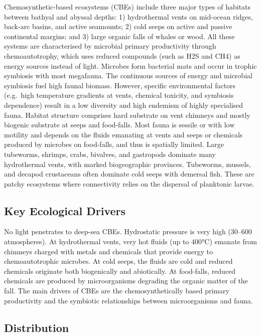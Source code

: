 \documentclass[
  letterpaper,
  DIV=11,
  numbers=noendperiod]{scrartcl}
\begin{document}
Chemosynthetic-based ecosystems (CBEs) include three major types of
habitats between bathyal and abyssal depths: 1) hydrothermal vents on
mid-ocean ridges, back-arc basins, and active seamounts; 2) cold seeps
on active and passive continental margins; and 3) large organic falls of
whales or wood. All these systems are characterised by microbial primary
productivity through chemoautotrophy, which uses reduced compounds (such
as H2S and CH4) as energy sources instead of light. Microbes form
bacterial mats and occur in trophic symbiosis with most megafauna. The
continuous sources of energy and microbial symbiosis fuel high faunal
biomass. However, specific environmental factors (e.g.~high temperature
gradients at vents, chemical toxicity, and symbiosis dependence) result
in a low diversity and high endemism of highly specialised fauna.
Habitat structure comprises hard substrate on vent chimneys and mostly
biogenic substrate at seeps and food-falls. Most fauna is sessile or
with low motility and depends on the fluids emanating at vents and seeps
or chemicals produced by microbes on food-falls, and thus is spatially
limited. Large tubeworms, shrimps, crabs, bivalves, and gastropods
dominate many hydrothermal vents, with marked biogeographic provinces.
Tubeworms, mussels, and decapod crustaceans often dominate cold seeps
with demersal fish. These are patchy ecosystems where connectivity
relies on the dispersal of planktonic larvae.

\subsection{Key Ecological Drivers}\label{key-ecological-drivers-46}

No light penetrates to deep-sea CBEs. Hydrostatic pressure is very high
(30--600 atmospheres). At hydrothermal vents, very hot fluids (up to
400°C) emanate from chimneys charged with metals and chemicals that
provide energy to chemoautotrophic microbes. At cold seeps, the fluids
are cold and reduced chemicals originate both biogenically and
abiotically. At food-falls, reduced chemicals are produced by
microorganisms degrading the organic matter of the fall. The main
drivers of CBEs are the chemosynthetically based primary productivity
and the symbiotic relationships between microorganisms and fauna.

\subsection{Distribution}\label{distribution-46}
\end{document}
